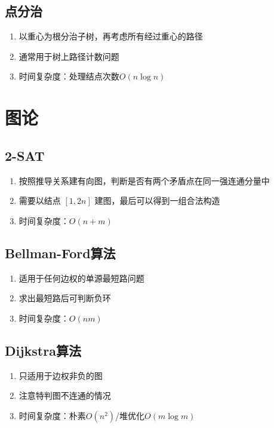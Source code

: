 \documentclass[twocolumn,a4,8pt]{article}  %
\begin{document}
		\subsection{点分治}
			\noindent\begin{enumerate}
				\item 以重心为根分治子树，再考虑所有经过重心的路径
				\item 通常用于树上路径计数问题
				\item 时间复杂度：处理结点次数$O(n\log n)$
			\end{enumerate}
			
	 	 	
	\section{图论}
		\subsection{2-SAT}
			\noindent\begin{enumerate}
				\item 按照推导关系建有向图，判断是否有两个矛盾点在同一强连通分量中
				\item 需要以结点 $[1,2n]$ 建图，最后可以得到一组合法构造
				\item 时间复杂度：$O(n+m)$
			\end{enumerate}
	 	 	

		\subsection{Bellman-Ford算法}
			\noindent\begin{enumerate}
				\item 适用于任何边权的单源最短路问题
				\item 求出最短路后可判断负环
				\item 时间复杂度：$O(nm)$
			\end{enumerate}
	 	 	
	 	 	
		\subsection{Dijkstra算法}
			\noindent\begin{enumerate}
				\item 只适用于边权非负的图
				\item 注意特判图不连通的情况
				\item 时间复杂度：朴素$O(n^2)$/堆优化$O(m\log m)$
			\end{enumerate}
	 	 	
	 	 	
\end{document}

